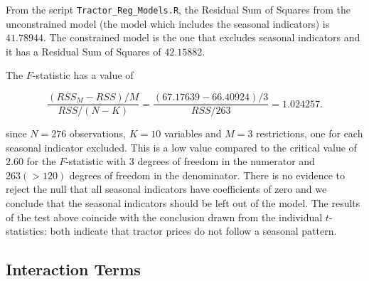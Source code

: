 \documentclass[11pt]{paper}
\begin{document}
From the script \texttt{Tractor\_Reg\_Models.R}, the Residual Sum of Squares from the unconstrained model (the model which includes the seasonal indicators) is $41.78944$. 
The constrained model is the one that excludes seasonal indicators and it has a Residual Sum of Squares of $42.15882$.

The $F$-statistic has a value of 

$$ 
\frac{(RSS_M - RSS)/M}{RSS/(N - K)} = \frac{(67.17639 - 66.40924)/3}{RSS/263} = 1.024257. 
$$

since $N = 276$ observations, $K = 10$ variables and $M = 3$ restrictions, one for each seasonal indicator excluded. 
This is a low value compared to the critical value of $2.60$ for the $F$-statistic with $3$ degrees of freedom in the numerator and $263 (> 120)$ degrees of freedom in the denominator. 
There is no evidence to reject the null that all seasonal indicators have coefficients of zero and we conclude that the seasonal indicators should be left out of the model. 
%
The results of the test above coincide with the conclusion drawn from
the individual $t$-statistics:
both indicate that tractor prices do not follow a seasonal pattern. 


\clearpage
\subsection{Interaction Terms}


%
%
%
\end{document}
